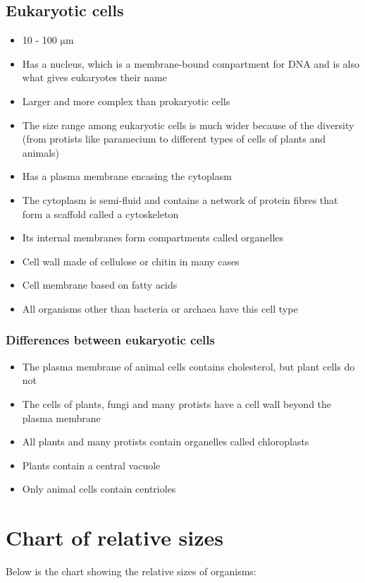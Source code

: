 \documentclass[11pt]{article}
\begin{document}
\subsection{Eukaryotic cells}
\label{sec:orgc380fb8}
\begin{itemize}
\item 10 - 100 \(\unit{\micro\metre}\)
\item Has a nucleus, which is a membrane-bound compartment for DNA and is also what gives eukaryotes their name
\item Larger and more complex than prokaryotic cells
\item The size range among eukaryotic cells is much wider because of the diversity (from protists like paramecium to different types of cells of plants and animals)
\item Has a plasma membrane encasing the cytoplasm
\item The cytoplasm is semi-fluid and contains a network of protein fibres that form a scaffold called a cytoskeleton
\item Its internal membranes form compartments called organelles
\item Cell wall made of cellulose or chitin in many cases
\item Cell membrane based on fatty acids
\item All organisms other than bacteria or archaea have this cell type
\end{itemize}
\subsubsection{Differences between eukaryotic cells}
\label{sec:orge075722}
\begin{itemize}
\item The plasma membrane of animal cells contains cholesterol, but plant cells do not
\item The cells of plants, fungi and many protists have a cell wall beyond the plasma membrane
\item All plants and many protists contain organelles called chloroplasts
\item Plants contain a central vacuole
\item Only animal cells contain centrioles
\end{itemize}
\section{Chart of relative sizes}
\label{sec:org65d9fea}
Below is the chart showing the relative sizes of organisms:
\end{document}

